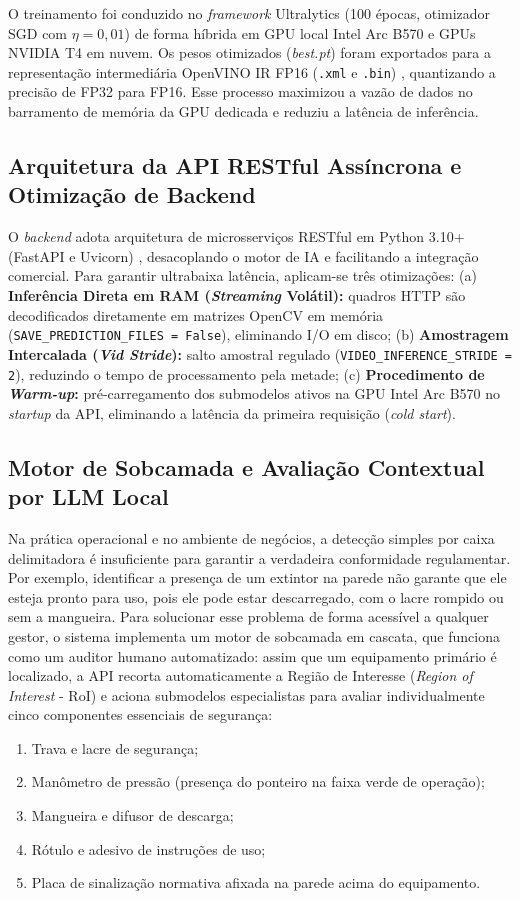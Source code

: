 \documentclass[a4paper,11pt]{article}
\begin{document}
O treinamento foi conduzido no \textit{framework} Ultralytics \cite{ultralytics2026} (100 épocas, otimizador SGD com $\eta = 0{,}01$) de forma híbrida em GPU local Intel Arc B570 e GPUs NVIDIA T4 em nuvem. Os pesos otimizados (\textit{best.pt}) foram exportados para a representação intermediária OpenVINO IR FP16 (\texttt{.xml} e \texttt{.bin}) \cite{intel2026}, quantizando a precisão de FP32 para FP16. Esse processo maximizou a vazão de dados no barramento de memória da GPU dedicada e reduziu a latência de inferência.

\subsection*{Arquitetura da API RESTful Assíncrona e Otimização de Backend}
O \textit{backend} adota arquitetura de microsserviços RESTful em Python 3.10+ (FastAPI e Uvicorn) \cite{fielding2000architectural}, desacoplando o motor de IA e facilitando a integração comercial. Para garantir ultrabaixa latência, aplicam-se três otimizações:
(a) \textbf{Inferência Direta em RAM (\textit{Streaming} Volátil):} quadros HTTP são decodificados diretamente em matrizes OpenCV em memória (\texttt{SAVE\_PREDICTION\_FILES = False}), eliminando I/O em disco;
(b) \textbf{Amostragem Intercalada (\textit{Vid Stride}):} salto amostral regulado (\texttt{VIDEO\_INFERENCE\_STRIDE = 2}), reduzindo o tempo de processamento pela metade;
(c) \textbf{Procedimento de \textit{Warm-up}:} pré-carregamento dos submodelos ativos na GPU Intel Arc B570 no \textit{startup} da API, eliminando a latência da primeira requisição (\textit{cold start}).

\subsection*{Motor de Sobcamada e Avaliação Contextual por LLM Local}
Na prática operacional e no ambiente de negócios, a detecção simples por caixa delimitadora é insuficiente para garantir a verdadeira conformidade regulamentar. Por exemplo, identificar a presença de um extintor na parede não garante que ele esteja pronto para uso, pois ele pode estar descarregado, com o lacre rompido ou sem a mangueira. Para solucionar esse problema de forma acessível a qualquer gestor, o sistema implementa um motor de sobcamada em cascata, que funciona como um auditor humano automatizado: assim que um equipamento primário é localizado, a API recorta automaticamente a Região de Interesse (\textit{Region of Interest} - RoI) e aciona submodelos especialistas para avaliar individualmente cinco componentes essenciais de segurança:
\begin{enumerate}[noitemsep,topsep=2pt,parsep=0pt,partopsep=0pt]
    \item Trava e lacre de segurança;
    \item Manômetro de pressão (presença do ponteiro na faixa verde de operação);
    \item Mangueira e difusor de descarga;
    \item Rótulo e adesivo de instruções de uso;
    \item Placa de sinalização normativa afixada na parede acima do equipamento.
\end{enumerate}
\end{document}
